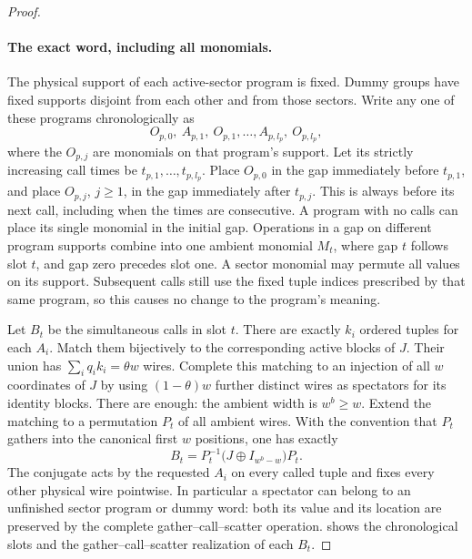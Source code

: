 \begin{proof}
\paragraph{The exact word, including all monomials.}
The physical support of each active-sector program is fixed.  Dummy
groups have fixed supports disjoint from each other and from those
sectors.  Write any one of these programs chronologically as
\[
 O_{p,0},\ A_{p,1},\ O_{p,1},\ldots,
 A_{p,l_p},\ O_{p,l_p},
\]
where the \(O_{p,j}\) are monomials on that program's support.  Let its
strictly increasing call times be \(t_{p,1},\ldots,t_{p,l_p}\).
Place \(O_{p,0}\) in the gap immediately before \(t_{p,1}\), and place
\(O_{p,j}\), \(j\geq1\), in the gap immediately after \(t_{p,j}\).
This is always before its next call, including when the times are
consecutive.  A program with no calls can place its single monomial in
the initial gap.  Operations in a gap on different program supports
combine into one ambient monomial \(M_t\), where gap \(t\) follows
slot \(t\), and gap zero precedes slot one.  A sector monomial may
permute all values on its support.  Subsequent calls still use the fixed
tuple indices prescribed by that same program, so this causes no change
to the program's meaning.

Let \(B_t\) be the simultaneous calls in slot \(t\).  There are
exactly \(k_i\) ordered tuples for each \(A_i\).  Match them bijectively
to the corresponding active blocks of \(J\).  Their union has
\(\sum_iq_i k_i=\theta w\) wires.  Complete this matching to an
injection of all \(w\) coordinates of \(J\) by using
\((1-\theta)w\) further distinct wires as spectators for its identity
blocks.  There are enough: the ambient width is \(w^b\geq w\).
Extend the matching to a permutation \(P_t\) of all ambient wires.
With the convention that \(P_t\) gathers into the canonical first
\(w\) positions, one has exactly
\begin{equation}
 B_t=P_t^{-1}\bigl(J\oplus I_{w^b-w}\bigr)P_t.
 \label{price:gather-scatter}
\end{equation}
The conjugate acts by the requested \(A_i\) on every called tuple and
fixes every other physical wire pointwise.  In particular a spectator
can belong to an unfinished sector program or dummy word: both its value
and its location are preserved by the complete gather--call--scatter
operation.   shows the chronological slots
and the gather--call--scatter realization of each $B_t$.


\end{proof}

